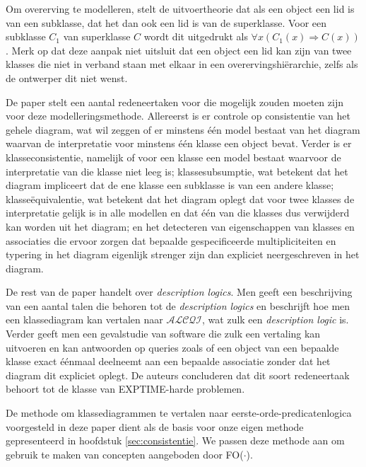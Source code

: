 Om overerving te modelleren, stelt de uitvoertheorie dat als een object een lid is van een subklasse, dat het dan ook een lid is van de superklasse. Voor een subklasse $C_1$ van superklasse $C$ wordt dit uitgedrukt als $\forall{x}(C_1(x) \Rightarrow C(x))$. Merk op dat deze aanpak niet uitsluit dat een object een lid kan zijn van twee klasses die niet in verband staan met elkaar in een overervingshi\"erarchie, zelfs als de ontwerper dit niet wenst.

De paper stelt een aantal redeneertaken voor die mogelijk zouden moeten zijn voor deze modelleringsmethode. Allereerst is er controle op consistentie van het gehele diagram, wat wil zeggen of er minstens \'e\'en model bestaat van het diagram waarvan de interpretatie voor minstens \'e\'en klasse een object bevat. Verder is er klasseconsistentie, namelijk of voor een klasse een model bestaat waarvoor de interpretatie van die klasse niet leeg is; klassesubsumptie, wat betekent dat het diagram impliceert dat de ene klasse een subklasse is van een andere klasse; klasse\"equivalentie, wat betekent dat het diagram oplegt dat voor twee klasses de interpretatie gelijk is in alle modellen en dat \'e\'en van die klasses dus verwijderd kan worden uit het diagram; en het detecteren van eigenschappen van klasses en associaties die ervoor zorgen dat bepaalde gespecificeerde multipliciteiten en typering in het diagram eigenlijk strenger zijn dan expliciet neergeschreven in het diagram.

De rest van de paper handelt over \textit{description logics}. Men geeft een beschrijving van een aantal talen die behoren tot de \textit{description logics} en beschrijft hoe men een klassediagram kan vertalen naar $\mathcal{ALCQI}$\cite{LutzCarsten2005Tcof}, wat zulk een \textit{description logic} is. Verder geeft men een gevalstudie van software die zulk een vertaling kan uitvoeren en kan antwoorden op queries zoals of een object van een bepaalde klasse exact \'e\'enmaal deelneemt aan een bepaalde associatie zonder dat het diagram dit expliciet oplegt. De auteurs concluderen dat dit soort redeneertaak behoort tot de klasse van EXPTIME-harde problemen.

De methode om klassediagrammen te vertalen naar eerste-orde-predicatenlogica voorgesteld in deze paper dient als de basis voor onze eigen methode gepresenteerd in hoofdstuk \ref{sec:consistentie}. We passen deze methode aan om gebruik te maken van concepten aangeboden door FO($\cdot$)\cite{DeCatBroes2014PLaa}.

